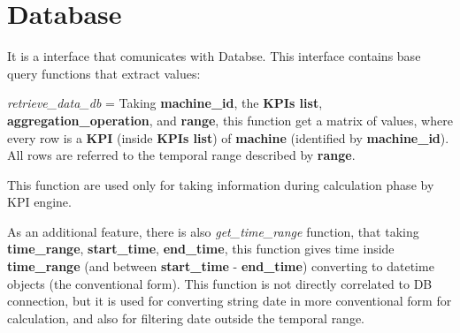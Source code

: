 \chapter{Database}
\hypertarget{md_doc_2_database}{}\label{md_doc_2_database}
\label{md_doc_2_database_autotoc_md16}%
%


It is a interface that comunicates with Databse. This interface contains base query functions that extract values\+:


\begin{DoxyItemize}
\item {\itshape retrieve\+\_\+data\+\_\+db} = Taking {\bfseries{machine\+\_\+id}}, the {\bfseries{KPI\textquotesingle{}s list}}, {\bfseries{aggregation\+\_\+operation}}, and {\bfseries{range}}, this function get a matrix of values, where every row is a {\bfseries{KPI}} (inside {\bfseries{KPI\textquotesingle{}s list}}) of {\bfseries{machine}} (identified by {\bfseries{machine\+\_\+id}}). All rows are referred to the temporal range described by {\bfseries{range}}.
\end{DoxyItemize}

This function are used only for taking information during calculation phase by KPI engine.

As an additional feature, there is also {\itshape get\+\_\+time\+\_\+range} function, that taking {\bfseries{time\+\_\+range}}, {\bfseries{start\+\_\+time}}, {\bfseries{end\+\_\+time}}, this function gives time inside {\bfseries{time\+\_\+range}} (and between {\bfseries{start\+\_\+time}} -\/ {\bfseries{end\+\_\+time}}) converting to datetime objects (the conventional form). This function is not directly correlated to DB connection, but it is used for converting string date in more conventional form for calculation, and also for filtering date outside the temporal range. 